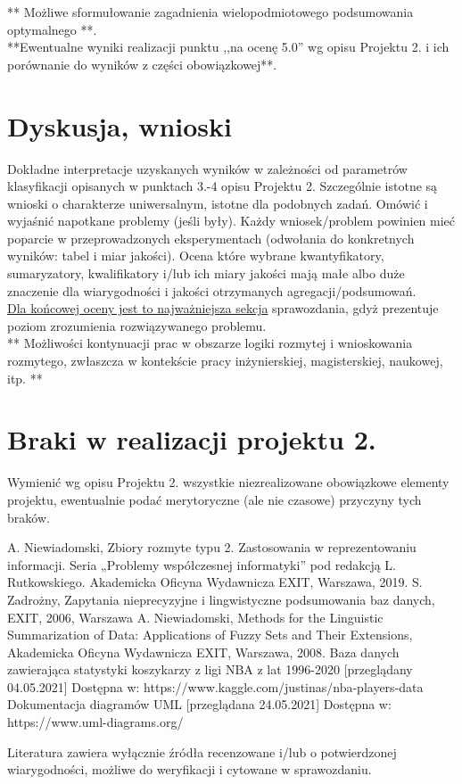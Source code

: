 \documentclass{classrep}
\begin{document}
** Możliwe sformułowanie zagadnienia wielopodmiotowego podsumowania optymalnego **.\\

{**Ewentualne wyniki realizacji punktu ,,na ocenę 5.0'' wg opisu Projektu 2. i ich porównanie do wyników z
części obowiązkowej**.}\\



\section{Dyskusja, wnioski}
Dokładne interpretacje uzyskanych wyników w zależności od parametrów klasyfikacji
opisanych w punktach 3.-4 opisu Projektu 2. 
Szczególnie istotne są wnioski o charakterze uniwersalnym, istotne dla podobnych zadań. 
Omówić i wyjaśnić napotkane problemy (jeśli były). Każdy wniosek/problem powinien mieć poparcie
w przeprowadzonych eksperymentach (odwołania do konkretnych wyników: tabel i miar
jakości). Ocena które wybrane kwantyfikatory, sumaryzatory, kwalifikatory i/lub ich
miary jakości mają małe albo duże znaczenie dla wiarygodności i jakości otrzymanych
agregacji/podsumowań.  \\
\underline{Dla końcowej oceny jest to najważniejsza sekcja} sprawozdania, gdyż prezentuje poziom
zrozumienia rozwiązywanego problemu.\\

** Możliwości kontynuacji prac w obszarze logiki rozmytej i wnioskowania rozmytego, zwłaszcza w kontekście pracy inżynierskiej,
magisterskiej, naukowej, itp. **\\



\section{Braki w realizacji projektu 2.}
Wymienić wg opisu Projektu 2. wszystkie niezrealizowane obowiązkowe elementy projektu, ewentualnie
podać merytoryczne (ale nie czasowe) przyczyny tych braków. 


\begin{thebibliography}{99}
  A. Niewiadomski, Zbiory rozmyte typu 2. Zastosowania w reprezentowaniu informacji.  Seria „Problemy współczesnej informatyki” pod redakcją L. Rutkowskiego. Akademicka Oficyna Wydawnicza EXIT, Warszawa, 2019.
 S. Zadrożny, Zapytania nieprecyzyjne i lingwistyczne podsumowania baz danych, EXIT, 2006, Warszawa
 A. Niewiadomski, Methods for the Linguistic Summarization of Data: Applications of Fuzzy Sets and Their Extensions, Akademicka Oficyna Wydawnicza EXIT, Warszawa, 2008.
 Baza danych zawierająca statystyki koszykarzy z ligi NBA z lat 1996-2020 [przeglądany 04.05.2021] Dostępna w:
https://www.kaggle.com/justinas/nba-players-data
 Dokumentacja diagramów UML [przeglądana 24.05.2021] Dostępna w:
https://www.uml-diagrams.org/
\end{thebibliography}

Literatura zawiera wyłącznie źródła recenzowane i/lub o potwierdzonej wiarygodności,
możliwe do weryfikacji i cytowane w sprawozdaniu. 
\end{document}
